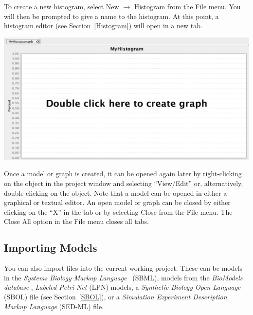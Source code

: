 \documentclass[titlepage,11pt]{article}
\begin{document}
To create a new histogram, select New $\rightarrow$ Histogram from the File menu. You will then be prompted to give a name to the histogram.  At this point, a histogram editor (see Section~\ref{Histogram}) will open in a new tab.  

\begin{center}
\includegraphics[width=160mm]{screenshots/Histogram}
\end{center}

Once a model or graph is created, it can be opened again later by right-clicking on the object in the project window and selecting ``View/Edit'' or, alternatively, double-clicking on the object.  Note that a model can be opened in either a graphical or textual editor.  An open model or graph can be closed by either clicking on the ``X'' in the tab or by selecting Close from the File menu.  The Close All option in the File menu closes all tabs.

\clearpage

\subsection{Importing Models}

\noindent
You can also import files into the current working project.  These can be models in the 
\emph{Systems Biology Markup Language}
~(SBML), models from the
\emph{BioModels database}
, \emph{Labeled Petri Net} (LPN) models, a 
\emph{Synthetic Biology Open Language}
(SBOL) file (see Section~\ref{SBOL}), or a 
\emph{Simulation Experiment Description Markup Language}
(SED-ML) file. 
\end{document}
